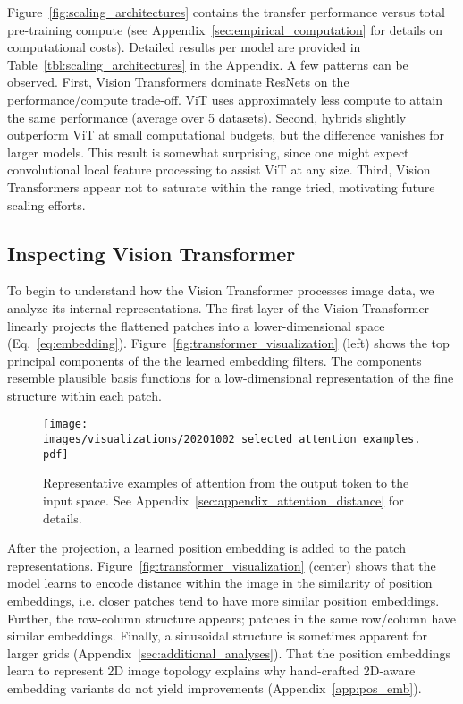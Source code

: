 \documentclass{article} \usepackage{iclr2021_conference,times}
\newcommand{\oursabbrv}{ViT\xspace}
\newcommand{\oursfull}{Vision Transformer\xspace}
\begin{document}
Figure~\ref{fig:scaling_architectures} contains the transfer performance versus  total pre-training compute (see  Appendix~\ref{sec:empirical_computation} for details on computational costs).
Detailed results per model are provided in Table~\ref{tbl:scaling_architectures} in the Appendix.
A few patterns can be observed.
First, \oursfull{}s dominate ResNets on the performance/compute trade-off.
\oursabbrv{} uses approximately  less compute to attain the same performance (average over 5 datasets).
Second, hybrids slightly outperform \oursabbrv{} at small computational budgets, but the difference vanishes for larger models.
This result is somewhat surprising, since one might expect convolutional local feature processing to assist \oursabbrv{} at any size.
Third, \oursfull{}s appear not to saturate within the range tried, motivating future scaling efforts.



\subsection{Inspecting \oursfull{}}
To begin to understand how the \oursfull{} processes image data, we analyze its internal representations. The first layer of the \oursfull{} linearly projects the flattened patches into a lower-dimensional space (Eq.~\ref{eq:embedding}). Figure~\ref{fig:transformer_visualization} (left) shows the top principal components of the the learned embedding filters. 
The components resemble plausible basis functions for a low-dimensional representation of the fine structure within each patch.

\begin{wrapfigure}{r}{0.3\textwidth}
\centering
\texttt{[image: images/visualizations/20201002\_selected\_attention\_examples.pdf]}
\caption{Representative examples of attention from the output token to the input space. See Appendix~\ref{sec:appendix_attention_distance} for details.}
\label{fig:selected_attention_examples}
\vspace{6mm}
\end{wrapfigure}
After the projection, a learned position embedding is added to the  patch representations. 
Figure~\ref{fig:transformer_visualization} (center) shows that the model learns to encode distance within the image in the similarity of position embeddings, i.e. closer patches tend to have more similar position embeddings. 
Further, the row-column structure appears; patches in the same row/column have similar embeddings.
Finally, a sinusoidal structure is sometimes apparent for larger grids (Appendix~\ref{sec:additional_analyses}). 
That the position embeddings learn to represent 2D image topology explains why hand-crafted 2D-aware embedding variants do not yield improvements (Appendix~\ref{app:pos_emb}).
\end{document}
